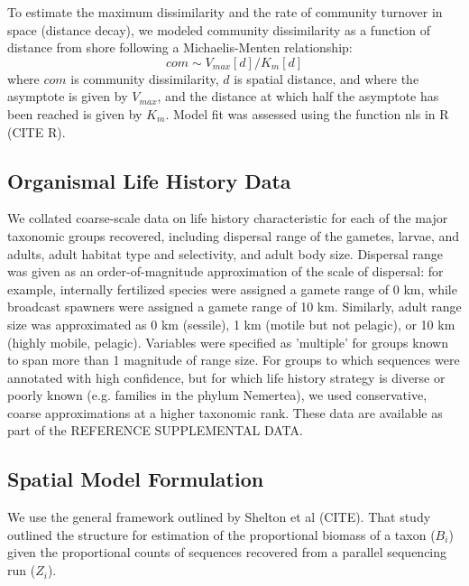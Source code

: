 \documentclass[11pt,letterpaper]{article} %
\begin{document}
To estimate the maximum dissimilarity and the rate of community turnover in space (distance decay), we modeled community dissimilarity as a function of distance from shore following a Michaelis-Menten relationship:
\begin{equation}\label{MichaelisMenten}
	com \sim V_{max}[d]/K_{m}[d]
\end{equation}
where $com$ is community dissimilarity, $d$ is spatial distance, and where the asymptote is given by $V_{max}$, and the distance at which half the asymptote has been reached is given by $K_{m}$.
Model fit was assessed using the function nls in R (CITE R).


\subsection*{Organismal Life History Data}
We collated coarse-scale data on life history characteristic for each of the major taxonomic groups recovered, including dispersal range of the gametes, larvae, and adults, adult habitat type and selectivity, and adult body size.
Dispersal range was given as an order-of-magnitude approximation of the scale of dispersal: for example, internally fertilized species were assigned a gamete range of 0 km, while broadcast spawners were assigned a gamete range of 10 km.
Similarly, adult range size was approximated as 0 km (sessile), 1 km (motile but not pelagic), or 10 km (highly mobile, pelagic).
Variables were specified as 'multiple' for groups known to span more than 1 magnitude of range size.
For groups to which sequences were annotated with high confidence, but for which life history strategy is diverse or poorly known (e.g. families in the phylum Nemertea), we used conservative, coarse approximations at a higher taxonomic rank.
These data are available as part of the REFERENCE SUPPLEMENTAL DATA.


\subsection*{Spatial Model Formulation}
We use the general framework outlined by Shelton et al (CITE).
That study outlined the structure for estimation of the proportional biomass of a taxon ($B_i$) given the proportional counts of sequences recovered from a parallel sequencing run ($Z_i$).
\end{document}
